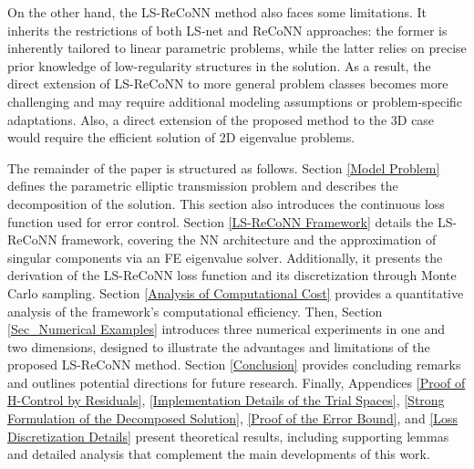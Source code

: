 \documentclass[oneside]{article}
\begin{document}

On the other hand, the LS-ReCoNN method also faces some limitations. It inherits the restrictions of both LS-net and ReCoNN approaches: the former is inherently tailored to linear parametric problems, while the latter relies on precise prior knowledge of low-regularity structures in the solution. As a result, the direct extension of LS-ReCoNN to more general problem classes becomes more challenging and may require additional modeling assumptions or problem-specific adaptations. Also, a direct extension of the proposed method to the 3D case would require the efficient solution of 2D eigenvalue problems.




The remainder of the paper is structured as follows.
Section \ref{Model Problem} defines the parametric elliptic transmission problem and describes the decomposition of the solution. This section also introduces the continuous loss function used for error control. 
Section \ref{LS-ReCoNN Framework} details the LS-ReCoNN framework, covering the NN architecture and the approximation of singular components via an FE eigenvalue solver. Additionally, it presents the derivation of the LS-ReCoNN loss function and its discretization through Monte Carlo sampling. 
Section \ref{Analysis of Computational Cost} provides a quantitative analysis of the framework's computational efficiency. 
Then, Section \ref{Sec_Numerical Examples} introduces three numerical experiments in one and two dimensions, designed to illustrate the advantages and limitations of the proposed LS-ReCoNN method. 
Section \ref{Conclusion} provides concluding remarks and outlines potential directions for future research. Finally, Appendices \ref{Proof of H-Control by Residuals}, \ref{Implementation Details of the Trial Spaces}, \ref{Strong Formulation of the Decomposed Solution}, \ref{Proof of the Error Bound}, and \ref{Loss Discretization Details} present theoretical results, including supporting lemmas and detailed analysis that complement the main developments of this work.
\end{document}
